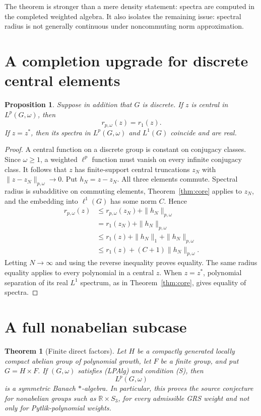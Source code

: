 \documentclass[11pt]{article}
\newtheorem{theorem}{Theorem}
\newtheorem{proposition}{Proposition}
\begin{document}
The theorem is stronger than a mere density statement: spectra are computed
in the completed weighted algebra.  It also isolates the remaining issue:
spectral radius is not generally continuous under noncommuting norm
approximation.

\section{A completion upgrade for discrete central elements}

\begin{proposition}\label{prop:center}
Suppose in addition that $G$ is discrete.  If $z$ is central in
$L^p(G,\omega)$, then
\[
 r_{p,\omega}(z)=r_1(z).
\]
If $z=z^*$, then its spectra in $L^p(G,\omega)$ and $L^1(G)$ coincide and
are real.
\end{proposition}

\begin{proof}
A central function on a discrete group is constant on conjugacy classes.
Since $\omega\geq1$, a weighted $\ell^p$ function must vanish on every
infinite conjugacy class.  It follows that $z$ has finite-support central
truncations $z_N$ with $\|z-z_N\|_{p,\omega}\to0$.  Put $h_N=z-z_N$.
All three elements commute.  Spectral radius is subadditive on commuting
elements, Theorem~\ref{thm:core} applies to $z_N$, and the embedding into
$\ell^1(G)$ has some norm $C$.  Hence
\begin{align*}
 r_{p,\omega}(z)
 &\leq r_{p,\omega}(z_N)+\|h_N\|_{p,\omega}\\
 &=r_1(z_N)+\|h_N\|_{p,\omega}\\
 &\leq r_1(z)+\|h_N\|_1+\|h_N\|_{p,\omega}\\
 &\leq r_1(z)+(C+1)\|h_N\|_{p,\omega}.
\end{align*}
Letting $N\to\infty$ and using the reverse inequality proves equality.
The same radius equality applies to every polynomial in a central $z$.
When $z=z^*$, polynomial separation of its real $L^1$ spectrum, as in
Theorem~\ref{thm:core}, gives equality of spectra.
\end{proof}

\section{A full nonabelian subcase}

\begin{theorem}[Finite direct factors]\label{thm:finite}
Let $H$ be a compactly generated locally compact abelian group of polynomial
growth, let $F$ be a finite group, and put $G=H\times F$.  If
$(G,\omega)$ satisfies (LPAlg) and condition (S), then
\[
 L^p(G,\omega)
\]
is a symmetric Banach $*$-algebra.  In particular, this proves the source
conjecture for nonabelian groups such as $\mathbb R\times S_3$, for every
admissible GRS weight and not only for Pytlik-polynomial weights.
\end{theorem}
\end{document}
